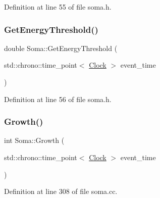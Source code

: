 Definition at line 55 of file soma.\+h.

\mbox{\label{class_soma_a0b45cc454565027bb25daa1396056a7e}} 
\subsubsection{\texorpdfstring{Get\+Energy\+Threshold()}{GetEnergyThreshold()}}
{\footnotesize\ttfamily double Soma\+::\+Get\+Energy\+Threshold (\begin{DoxyParamCaption}\item[{std\+::chrono\+::time\+\_\+point$<$ \mbox{\hyperlink{universe_8h_a0ef8d951d1ca5ab3cfaf7ab4c7a6fd80}{Clock}} $>$}]{event\+\_\+time }\end{DoxyParamCaption})\hspace{0.3cm}{\ttfamily [inline]}}



Definition at line 56 of file soma.\+h.

\mbox{\label{class_soma_aa6162ca8a98a14cf49ba8310db129d47}} 
\subsubsection{\texorpdfstring{Growth()}{Growth()}}
{\footnotesize\ttfamily int Soma\+::\+Growth (\begin{DoxyParamCaption}\item[{std\+::chrono\+::time\+\_\+point$<$ \mbox{\hyperlink{universe_8h_a0ef8d951d1ca5ab3cfaf7ab4c7a6fd80}{Clock}} $>$}]{event\+\_\+time }\end{DoxyParamCaption})}



Definition at line 308 of file soma.\+cc.

